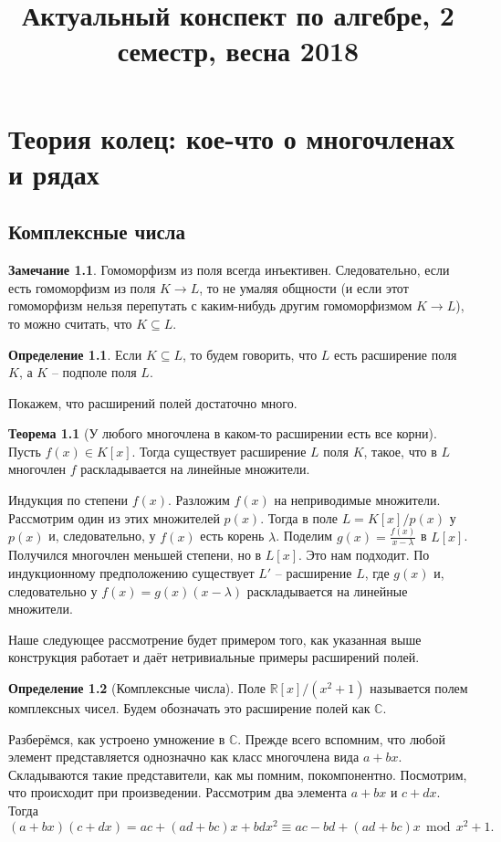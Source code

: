 \documentclass[10pt,a4paper,oneside]{book} %
\theoremstyle{definition}
\newtheorem*{rem}{Замечание}
\newtheorem*{defn}{Определение}
\newtheorem{thm}{Теорема}
\renewcommand{\mod}{\,\operatorname{mod}\,}
\newcommand{\mb}[1]{\mathbb{#1}}
\def\thrm{\begin{thm}}
\def\ethrm{\end{thm}}
\def\dfn{\begin{defn}}
\def\edfn{\end{defn}}
\def\rm{\begin{rem}}
\def\erm{\end{rem}}
\begin{document}
\title{Актуальный конспект по алгебре, 2 семестр, весна 2018}
\date{}
\author{}
\maketitle
\tableofcontents

\setcounter{chapter}{1}

\chapter{Теория колец: кое-что о многочленах и рядах}

\section{Комплексные числа}
\rm Гомоморфизм из поля всегда инъективен. Следовательно, если есть гомоморфизм из поля $K\to L$, то не умаляя общности (и если этот гомоморфизм нельзя перепутать с каким-нибудь другим гомоморфизмом $K\to L$), то можно считать, что $K\subseteq L$.
\erm

\dfn Если $K\subseteq L$, то будем говорить, что $L$ есть расширение поля $K$, а $K$ -- подполе поля $L$.
\edfn
Покажем, что расширений полей достаточно много.
\thrm[У любого многочлена в каком-то расширении есть все корни] Пусть $f(x)\in K[x]$. Тогда существует расширение $L$ поля $K$, такое, что в $L$ многочлен $f$ раскладывается на линейные множители.
\ethrm
\proof Индукция по степени $f(x)$. Разложим $f(x)$ на неприводимые множители. Рассмотрим один из этих множителей $p(x)$. Тогда в поле $L=K[x]/p(x)$ у $p(x)$ и, следовательно, у $f(x)$ есть корень $\lambda$. Поделим $g(x)=\frac{f(x)}{x-\lambda}$ в $L[x]$. Получился многочлен меньшей степени, но в $L[x]$. Это нам подходит. По индукционному предположению существует $L'$ -- расширение $L$, где  $g(x)$ и, следовательно у $f(x)=g(x)(x-\lambda)$ раскладывается на линейные множители.
\endproof

Наше следующее рассмотрение будет примером того, как указанная выше конструкция работает и даёт нетривиальные примеры расширений полей.

\dfn[Комплексные числа] Поле $\mb R[x]/(x^2 + 1)$ называется полем комплексных чисел. Будем обозначать это расширение полей как $\mb C$.
\edfn

Разберёмся, как устроено умножение в $\mb C$. Прежде всего вспомним, что любой элемент представляется однозначно как класс многочлена вида $a+bx$. Складываются такие представители, как мы помним, покомпонентно. Посмотрим, что происходит при произведении. Рассмотрим два элемента $a+bx$ и $c+dx$. Тогда
$$(a+bx)(c+dx)=ac+(ad+bc)x+bdx^2\equiv ac-bd + (ad+bc)x \mod x^2+1.$$
\end{document}
